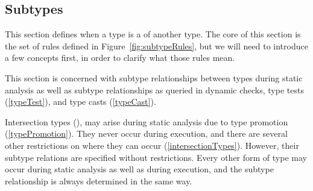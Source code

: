 \documentclass[makeidx]{article}
\begin{document}
{\subsection{Subtypes}

\LMHash{}%
This section defines when a type is a  of another type.
The core of this section is the set of rules defined in
Figure~\ref{fig:subtypeRules},
but we will need to introduce a few concepts first,
in order to clarify what those rules mean.


\LMHash{}%
This section is concerned with subtype relationships between types
during static analysis
as well as subtype relationships as queried in dynamic checks,
type tests
(\ref{typeTest}),
and type casts
(\ref{typeCast}).


\LMHash{}%
Intersection types
(),
may arise during static analysis due to type promotion
(\ref{typePromotion}).
They never occur during execution,
and there are several other restrictions on where they can occur
(\ref{intersectionTypes}).
However, their subtype relations are specified without restrictions.
Every other form of type may occur during static analysis
as well as during execution,
and the subtype relationship is always determined in the same way.

\newcommand{\SrnReflexivity}{1}
\newcommand{\SrnRightTop}{2}
\newcommand{\SrnLeftTop}{3}
\newcommand{\SrnBottom}{4}
\newcommand{\SrnRightObjectFour}{5}
\newcommand{\SrnNullOne}{6}
\newcommand{\SrnLeftFutureOr}{7}
\newcommand{\SrnLeftNullable}{8}
\newcommand{\SrnLeftPromotedVariableOne}{9}
\newcommand{\SrnRightPromotedVariable}{10}
\newcommand{\SrnRightFutureOrA}{11}
\newcommand{\SrnRightFutureOrB}{12}
\newcommand{\SrnRightNullableOne}{13}
\newcommand{\SrnRightNullableTwo}{14}
\newcommand{\SrnLeftPromotedVariableTwo}{15}
\newcommand{\SrnLeftVariableBound}{16}
\newcommand{\SrnRightFunction}{17}
\newcommand{\SrnPositionalFunctionType}{18}
\newcommand{\SrnNamedFunctionType}{19}
\newcommand{\SrnCovariance}{20}
\newcommand{\SrnNominal}{21}

}
\end{document}
